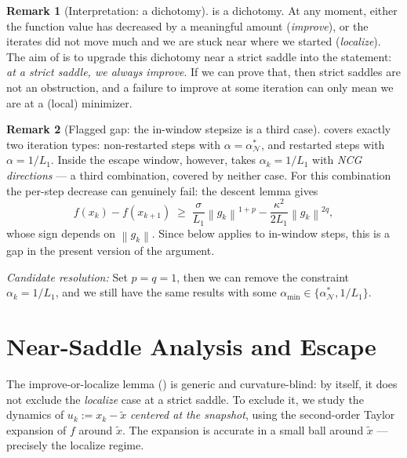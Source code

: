 \documentclass[11pt,a4paper]{article}
\theoremstyle{plain}
\theoremstyle{definition}
\newtheorem{remark}{Remark}
\newcommand{\norm}[1]{\left\|#1\right\|}
\newcommand{\Lone}{L_{1}}
\newcommand{\setN}{\mathcal{N}}
\newcommand{\snap}{\tilde{x}}
\begin{document}
\begin{remark}[Interpretation: a dichotomy]\label{rem:improve}
 is a dichotomy. At any moment, either the function value has
decreased by a meaningful amount (\emph{improve}), or the iterates did not move much
and we are stuck near where we started (\emph{localize}). The aim of
 is to upgrade this dichotomy near a strict saddle into the
statement: \emph{at a strict saddle, we always improve}. If we can prove that, then
strict saddles are not an obstruction, and a failure to improve at some iteration can
only mean we are at a (local) minimizer.
\end{remark}

\begin{remark}[Flagged gap: the in-window stepsize is a third case]
\label{rem:window-steps-gap}
 covers exactly two iteration types: non-restarted steps with
$\alpha = \alpha^{\ast}_{\setN}$, and restarted steps with $\alpha = 1/\Lone$.
Inside the escape window, however,  takes $\alpha_{k} = 1/\Lone$
with \emph{NCG directions} --- a third combination, covered by neither case. For
this combination the per-step decrease can genuinely fail: the descent lemma gives
\[
f(x_{k}) - f(x_{k+1})
\;\ge\; \frac{\sigma}{\Lone}\norm{g_{k}}^{1+p}
        - \frac{\kappa^{2}}{2\Lone}\norm{g_{k}}^{2q},
\]
whose sign depends on $\norm{g_{k}}$. Since  below applies
 to in-window steps, this is a gap in the present version of the
argument.

\emph{Candidate resolution:} Set $p = q = 1$, then we can remove the constraint $\alpha_k = 1/\Lone$,
and we still have the same results with some $\alpha_{\min} \in \{\alpha^{\ast}_{\mathcal{N}}, 1/\Lone\}$.
\end{remark}

\section{Near-Saddle Analysis and Escape}\label{sec:escape}

The improve-or-localize lemma () is generic and
curvature-blind: by itself, it does not exclude the \emph{localize} case at a
strict saddle. To exclude it, we study the dynamics of $u_{k} := x_{k}-\snap$
\emph{centered at the snapshot}, using the second-order Taylor expansion of $f$
around $\snap$. The expansion is accurate in a small ball around $\snap$ ---
precisely the localize regime.
\end{document}
